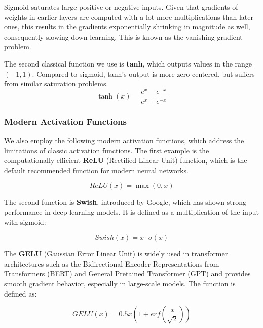 Sigmoid saturates large positive or negative inputs.  Given that gradients
of weights in earlier layers are computed with a lot more multiplications
than later ones, this results in the gradients exponentially shrinking in
magnitude as well, consequently slowing down learning.  This is known as the
vanishing gradient problem.

The second classical function we use is \textbf{tanh}, which outputs values
in the range $(-1, 1)$. Compared to sigmoid, tanh's output is more
zero-centered, but suffers from similar saturation problems.
\begin{equation}
\tanh(x) = \frac{e^{x} - e^{-x}}{e^{x} + e^{-x}}
\end{equation}

\subsubsection{Modern Activation Functions}

We also employ the following modern activation functions, which address the
limitations of classic activation functions.  The first example is the
computationally efficient \textbf{ReLU} (Rectified Linear Unit)
function\cite{NairHinton2010}, which is the default recommended function for
modern neural networks.\cite{Goodfellow-et-al-2016}

\begin{equation}
ReLU(x) = \max(0, x)
\end{equation}

The second function is \textbf{Swish}, introduced by Google, which has shown
strong performance in deep learning models.\cite{Ramachandran2017}  It is
defined as a multiplication of the input with sigmoid:

\begin{equation}
Swish(x) = x \cdot \sigma(x)
\end{equation}

The \textbf{GELU} (Gaussian Error Linear Unit) is widely used in transformer
architectures such as the Bidirectional Encoder Representations from
Transformers (BERT)\cite{turc2019} and General Pretained Transformer
(GPT)\cite{Radford2018} and provides smooth gradient behavior, especially in
large-scale models.\cite{Hendrycks2023} The function is defined as:

\begin{equation}
GELU(x) = 0.5x (1 + erf(\frac{x}{\sqrt{2}}))
\end{equation}

